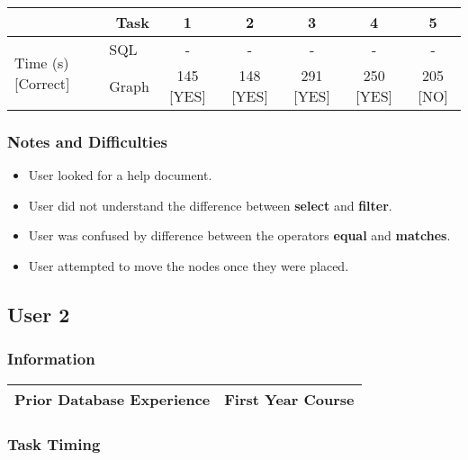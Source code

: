 \begin{tabular}{|l|l|c|c|c|c|c|}
	\hline
	\multicolumn{2}{|r|}{\textbf{Task}} & \textbf{1} & \textbf{2} & \textbf{3} & \textbf{4} & \textbf{5} \\
	\hline
	\multirow{2}{*}{Time (s) [Correct]} & SQL   & -   & -   & -   & -   & -   \\
	                                            & Graph & 145 [YES] & 148 [YES] & 291 [YES] & 250 [YES] & 205 [NO] \\
	\hline
\end{tabular}

\subsubsection{Notes and Difficulties}

\begin{itemize}

	\item
	User looked for a help document.

	\item
	User did not understand the difference between \textbf{select} and \textbf{filter}.

	\item
	User was confused by difference between the operators \textbf{equal} and \textbf{matches}.

	\item
	User attempted to move the nodes once they were placed.

\end{itemize}

\subsection{User 2}

\subsubsection{Information}

\begin{tabular}{|l|l|}
	\hline
	\textbf{Prior Database Experience} & First Year Course \\
	\hline
\end{tabular}

\subsubsection{Task Timing}

